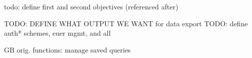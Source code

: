 todo: define first and second objectives (referenced after)



TODO: DEFINE WHAT OUTPUT WE WANT for data export
TODO: define auth* schemes, euer mgmt, and all

GB orig. functions: manage saved queries